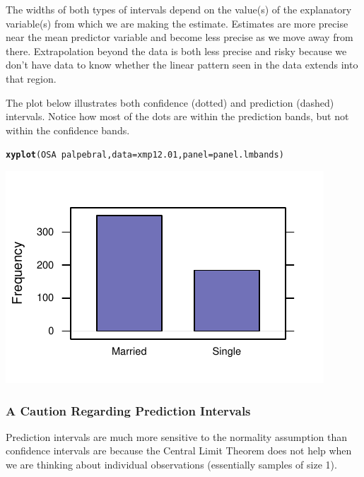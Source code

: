 \documentclass[twoside]{book}
\makeatletter
\newcommand{\hlopt}[1]{\textcolor[rgb]{0,0,0}{#1}}%
\newcommand{\hlstd}[1]{\textcolor[rgb]{0.345,0.345,0.345}{#1}}%
\newcommand{\hlkwc}[1]{\textcolor[rgb]{0.333,0.667,0.333}{#1}}%
\newcommand{\hlkwd}[1]{\textcolor[rgb]{0.737,0.353,0.396}{\textbf{#1}}}%
\newenvironment{kframe}{%
 \def\at@end@of@kframe{}%
 \ifinner\ifhmode%
  \def\at@end@of@kframe{\end{minipage}}%
  \begin{minipage}{\columnwidth}%
 \fi\fi%
 \def\FrameCommand##1{\hskip\@totalleftmargin \hskip-\fboxsep
 \colorbox{shadecolor}{##1}\hskip-\fboxsep
     \hskip-\linewidth \hskip-\@totalleftmargin \hskip\columnwidth}%
 \MakeFramed {\advance\hsize-\width
   \@totalleftmargin\z@ \linewidth\hsize
   \@setminipage}}%
 {\par\unskip\endMakeFramed%
 \at@end@of@kframe}
\newenvironment{knitrout}{}{} %
\makeatother
\begin{document}
The widths of both types of intervals depend on the value(s) of the explanatory
variable(s) from which we are making the estimate.  Estimates are more
precise near the mean predictor variable and become less precise as we move
away from there.  Extrapolation beyond the data is both less precise and risky
because we don't have data to know whether the linear pattern seen in the data
extends into that region.

The plot below illustrates both confidence (dotted) and prediction (dashed) 
intervals.
Notice how most of the dots are within the prediction bands, but not within the 
confidence bands.
\begin{knitrout}
\color{fgcolor}\begin{kframe}
\begin{alltt}
\hlkwd{xyplot}\hlstd{(OSA} \hlopt{~} \hlstd{palpebral,} \hlkwc{data} \hlstd{= xmp12.01,} \hlkwc{panel} \hlstd{= panel.lmbands)}
\end{alltt}
\end{kframe}

{\centering \includegraphics[width=.9\textwidth]{figures/fig-unnamed-chunk-23-1} 

}



\end{knitrout}

\subsubsection{A Caution Regarding Prediction Intervals}
Prediction intervals are much more sensitive to the normality assumption
than confidence intervals are because the Central Limit Theorem does not 
help when we are thinking about individual observations (essentially samples of 
size 1).
\end{document}
